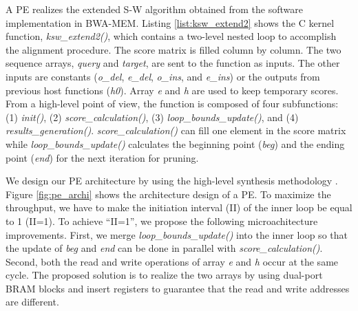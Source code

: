 A PE realizes the extended S-W algorithm obtained from the software implementation in BWA-MEM. 
Listing \ref{list:ksw_extend2} shows the C kernel function, \textit{ksw\_extend2()}, 
which contains a two-level nested loop to accomplish the alignment procedure.
The score matrix is filled column by column.
The two sequence arrays, \textit{query} and \textit{target}, are sent to the function as inputs.
The other inputs are constants (\emph{o\_del}, \emph{e\_del}, \emph{o\_ins}, and \emph{e\_ins}) or the outputs from previous host functions (\emph{h0}).
Array \emph{e} and \emph{h} are used to keep temporary scores.
From a high-level point of view, the function is composed of four subfunctions: 
(1) \textit{init()}, (2) \textit{score\_calculation()}, (3) \textit{loop\_bounds\_update()}, and (4) \textit{results\_generation()}.
\textit{score\_calculation()} can fill one element in the score matrix
while \textit{loop\_bounds\_update()} calculates the beginning point (\emph{beg}) and the ending point (\emph{end}) for the next iteration for pruning.


We design our PE architecture by using the high-level synthesis methodology \cite{Cong2004}.
Figure \ref{fig:pe_archi} shows the architecture design of a PE.
To maximize the throughput, we have to make the initiation interval (II) of the inner loop be equal to 1 (II=1). 
To achieve ``II=1'', we propose the following microachitecture improvements. 
First, we merge \textit{loop\_bounds\_update()} into the inner loop so that the update of \emph{beg} and \emph{end} 
can be done in parallel with \textit{score\_calculation()}.
Second, both the read and write operations of array \emph{e} and \emph{h} occur at the same cycle.
The proposed solution is to realize the two arrays by using dual-port BRAM blocks
and insert registers to guarantee that the read and write addresses are different.

